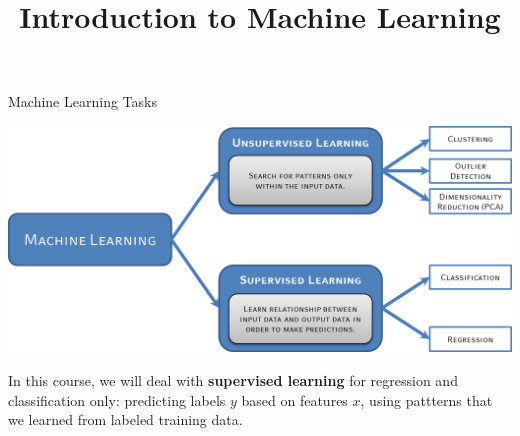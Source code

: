 \documentclass[11pt,compress,t,notes=noshow, xcolor=table]{beamer}
\title{Introduction to Machine Learning}
\begin{document}


\sloppy

\begin{frame}{Machine Learning Tasks}

\begin{center}
  \includegraphics[height=0.5\textheight]{figure_man/ml-types.png}
\end{center}

In this course, we will deal with \textbf{supervised learning} for regression and classification only: predicting labels $y$ based on features $x$, using pattterns that we learned from labeled training data.

\end{frame}
\end{document}
